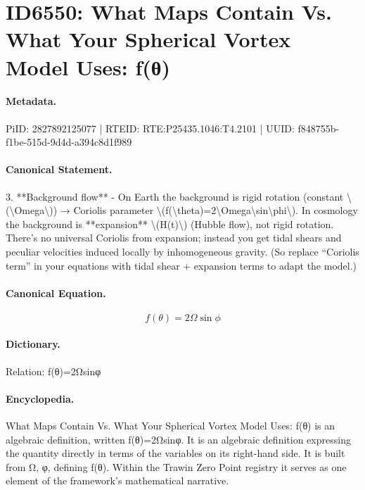 \section*{ID6550: What Maps Contain Vs. What Your Spherical Vortex Model Uses: f(θ)}
\paragraph{Metadata.}
PiID: 2827892125077 | RTEID: RTE:P25435.1046:T4.2101 | UUID: f848755b-f1be-515d-9d4d-a394c8d1f989

\paragraph{Canonical Statement.}
3. **Background flow** - On Earth the background is rigid rotation (constant \textbackslash{}(\textbackslash{}Omega\textbackslash{})) → Coriolis parameter \textbackslash{}(f(\textbackslash{}theta)=2\textbackslash{}Omega\textbackslash{}sin\textbackslash{}phi\textbackslash{}). In cosmology the background is **expansion** \textbackslash{}(H(t)\textbackslash{}) (Hubble flow), not rigid rotation. There’s no universal Coriolis from expansion; instead you get tidal shears and peculiar velocities induced locally by inhomogeneous gravity. (So replace “Coriolis term” in your equations with tidal shear + expansion terms to adapt the model.)

\paragraph{Canonical Equation.}
\[
f(\theta)=2\Omega\sin\phi
\]

\paragraph{Dictionary.}
Relation: f(θ)=2Ωsinφ

\paragraph{Encyclopedia.}
What Maps Contain Vs. What Your Spherical Vortex Model Uses: f(θ) is an algebraic definition, written f(θ)=2Ωsinφ. It is an algebraic definition expressing the quantity directly in terms of the variables on its right-hand side. It is built from Ω, φ, defining f(θ). Within the Trawin Zero Point registry it serves as one element of the framework's mathematical narrative.
